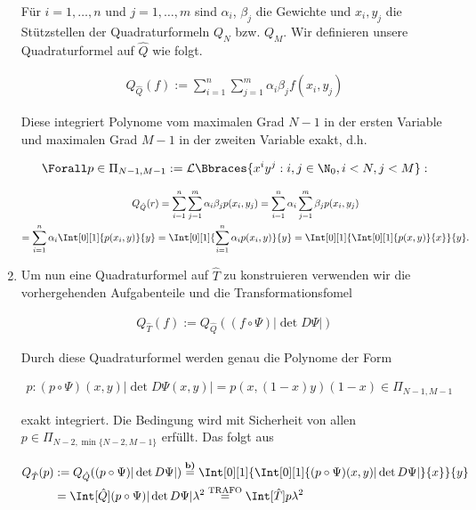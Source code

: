 \begin{solution}
\begin{enumerate}[label = \textbf{\alph*)}]
    Für $i = 1, \dots, n$ und $j = 1, \dots, m$ sind $\alpha_i$, $\beta_j$ die Gewichte und $x_i, y_j$ die Stützstellen der Quadraturformeln $Q_N$ bzw. $Q_M$.
    Wir definieren unsere Quadraturformel auf $\hat Q$ wie folgt.

    \begin{align*}
      Q_{\hat Q}(f)
      :=
      \sum_{i=1}^n
      \sum_{j=1}^m
      \alpha_i \beta_j
      f(x_i, y_j)
    \end{align*}

    Diese integriert Polynome vom maximalen Grad $N - 1$ in der ersten Variable und maximalen Grad $M - 1$ in der zweiten Variable exakt, d.h.

    \begin{align*}
      \Forall p \in \Pi_{N - 1, M - 1}
      :=
      \mathcal{L}
      \Bbraces{x^i y^j: i, j \in \N_0, i < N, j < M}:
    \end{align*}

    \begin{multline*}
      Q_{\hat Q}(r)
      =
      \sum_{i=1}^n
      \sum_{j=1}^m
      \alpha_i \beta_j
      p(x_i, y_j)
      =
      \sum_{i=1}^n
      \alpha_i
      \sum_{j=1}^m
      \beta_j
      p(x_i, y_j) \\
      =
      \sum_{i=1}^n
      \alpha_i
      \Int[0][1]{p(x_i, y)}{y}
      =
      \Int[0][1]
      {
        \sum_{i=1}^n
        \alpha_i
        p(x_i, y)
      }{y}
      =
      \Int[0][1]
      {
        \Int[0][1]{p(x, y)}{x}
      }{y}.
    \end{multline*}

    \item Um nun eine Quadraturformel auf $\hat{T}$ zu konstruieren verwenden wir die vorhergehenden Aufgabenteile
  und die Transformationsfomel

  \begin{align*}
    Q_{\hat{T}}(f)
    :=
    Q_{\hat{Q}}((f\circ \Psi) |\det D\Psi|)
  \end{align*}

  Durch diese Quadraturformel werden genau die Polynome der Form

  \begin{align*}
    p: (p \circ \Psi)(x,y) |\det D\Psi(x,y)| = p(x,(1-x)y)(1-x)\in \Pi_{N-1,M-1}
  \end{align*}

  exakt integriert. Die Bedingung wird mit Sicherheit von allen $p \in \Pi_{N-2,\min\{N-2,M-1\}}$
  erfüllt. Das folgt aus

  \begin{align*}
  Q_{\hat{T}}(p)
  &:=
  Q_{\hat{Q}}((p\circ \Psi) |\det D\Psi|)
  \stackrel{\textbf{b)}}{=}
  \Int[0][1]{
      \Int[0][1]{(p \circ \Psi)(x,y) |\det D\Psi|}{x}
            }{y} \\
  &=
  \Int[\hat{Q}]{(p \circ \Psi)|\det D\Psi|}{\lambda^2}
  \stackrel{\mathrm{TRAFO}}{=}
  \Int[\hat{T}]{p}{\lambda^2}
  \end{align*}
\end{enumerate}

  \end{solution}


